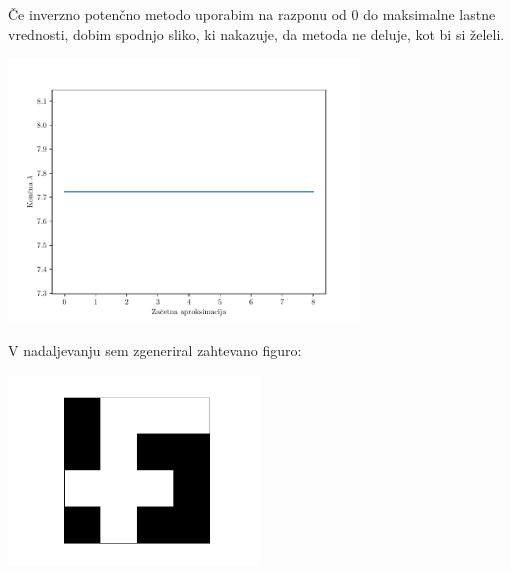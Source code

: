 Če inverzno potenčno metodo uporabim na razponu od 0 do maksimalne lastne vrednosti, dobim spodnjo sliko, ki nakazuje, da metoda ne deluje, kot bi si želeli.
\begin{center}
    \includegraphics[width=0.7\textwidth]{../old/1-0-inverse_powermethod_sweep.pdf}
\end{center}
V nadaljevanju sem zgeneriral zahtevano figuro:
\begin{center}
    \includegraphics[width=0.5\textwidth]{../old/1-figura.pdf}
\end{center}

